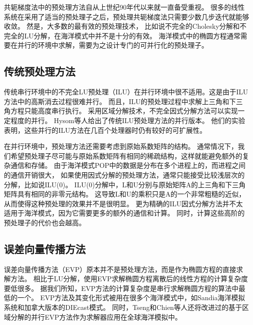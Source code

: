 共轭梯度法中的预处理方法自从上世纪90年代以来就一直备受重视。 
很多的线性系统在采用了适当的预处理子之后，预处理共轭梯度法只需要少数几步迭代就能够收敛。 
然是，大多数的最有效的预处理技术， 比如说不完全的Cholesky分解和不完全的LU分解，在海洋模式中并不是十分的有效。 
海洋模式中的椭圆方程通常需要在并行的环境中求解，需要为之设计专门的可并行化的预处理子。 



\subsection{传统预处理方法}
\label{related:classical}

传统串行环境中的不完全LU预处理（ILU）在并行环境中很不适用。这是由于ILU方法中的高斯消去过程很难并行。 
而且，ILU的预处理过程中求解上三角和下三角方程只能高度串行执行。
采用区域分解技术，不完全因式分解方法可以实现一定程度的并行。 
Hysom等人\cite{hysom2001scalable}给出了传统ILU预处理方法的并行版本。 
他们的实验表明，这些并行的ILU方法在几百个处理器时仍有较好的可扩展性。

在并行环境中，预处理方法还需要考虑到原始系数矩阵的结构。 
通常情况下，我们希望预处理子尽可能与原始系数矩阵有相同的稀疏结构，这样就能避免额外的复杂通信和存储。 
由于海洋模式POP中的数据是分布在多个进程上的，而进程之间的通信开销很大， 如果使用因式分解的预处理方法，通常只能接受比较浅层次的分解，比如说ILU(0)。 
ILU(0)分解中，L和U分别与原始矩阵A的上三角和下三角矩阵具有相同的非零元结构\cite{benzi2002preconditioning}。
这导致L和U的乘积只是A的一个非常粗糙的近似，从而使得这种预处理的效果并不是很明显。 
更为精确的ILU因式分解方法并不太适用于海洋模式，因为它需要更多的额外的通信和计算。 
同时，计算这些高阶的预处理子的代价也会越高。 

\subsection{误差向量传播方法}
\label{related:evp}


误差向量传播方法（EVP）原本并不是预处理方法，而是作为椭圆方程的直接求解方法。 
相比于LU分解，使用EVP求解椭圆方程离散后的线性方程的计算复杂度要低很多。 
据我们所知，EVP方法的计算复杂度是串行求解椭圆方程的算法中最低的一个。
EVP方法及其变化形式被用在很多个海洋模式中，如Sandia海洋模拟系统\cite{dietrich1987ocean}和加拿大版本的DIEcast模式\cite{tseng2011parallel}。 
同时，Tseng和Chien等人还将改进过的基于区域分解的并行EVP方法作为求解器应用在全球海洋模拟中。

